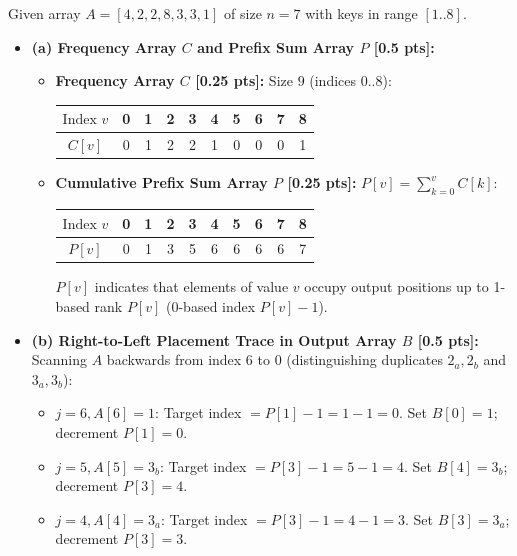 \documentclass[11pt,a4paper]{article}
\begin{document}
\begin{solutionbox}
Given array $A = [4, 2, 2, 8, 3, 3, 1]$ of size $n = 7$ with keys in range $[1..8]$.
\begin{itemize}
    \item \textbf{(a) Frequency Array $C$ and Prefix Sum Array $P$ [0.5 pts]:}
    \begin{itemize}
        \item \textbf{Frequency Array $C$ [0.25 pts]:} Size $9$ (indices $0..8$):
        \begin{center}
        \begin{tabular}{c|ccccccccc}
        \toprule
        $\text{Index } v$ & 0 & 1 & 2 & 3 & 4 & 5 & 6 & 7 & 8 \\
        \midrule
        $C[v]$ & 0 & 1 & 2 & 2 & 1 & 0 & 0 & 0 & 1 \\
        \bottomrule
        \end{tabular}
        \end{center}
        \item \textbf{Cumulative Prefix Sum Array $P$ [0.25 pts]:} $P[v] = \sum_{k=0}^v C[k]$:
        \begin{center}
        \begin{tabular}{c|ccccccccc}
        \toprule
        $\text{Index } v$ & 0 & 1 & 2 & 3 & 4 & 5 & 6 & 7 & 8 \\
        \midrule
        $P[v]$ & 0 & 1 & 3 & 5 & 6 & 6 & 6 & 6 & 7 \\
        \bottomrule
        \end{tabular}
        \end{center}
        $P[v]$ indicates that elements of value $v$ occupy output positions up to 1-based rank $P[v]$ (0-based index $P[v]-1$).
    \end{itemize}
    \item \textbf{(b) Right-to-Left Placement Trace in Output Array $B$ [0.5 pts]:}
    Scanning $A$ backwards from index $6$ to $0$ (distinguishing duplicates $2_a, 2_b$ and $3_a, 3_b$):
    \begin{itemize}
        \item $j = 6, A[6] = 1$: Target index $= P[1] - 1 = 1 - 1 = 0$. Set $B[0] = 1$; decrement $P[1] = 0$.
        \item $j = 5, A[5] = 3_b$: Target index $= P[3] - 1 = 5 - 1 = 4$. Set $B[4] = 3_b$; decrement $P[3] = 4$.
        \item $j = 4, A[4] = 3_a$: Target index $= P[3] - 1 = 4 - 1 = 3$. Set $B[3] = 3_a$; decrement $P[3] = 3$.

\end{itemize}
\end{itemize}
\end{solutionbox}
\end{document}
